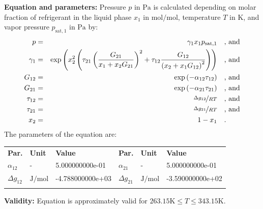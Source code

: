 \textbf{Equation and parameters:}
\newline
%
Pressure $p$ in $\si{\pascal}$ is calculated depending on molar fraction of refrigerant in the liquid phase $x_1$ in $\si{\mole\per\mole}$, temperature $T$ in $\si{\kelvin}$, and vapor pressure $p_\mathrm{sat,1}$ in $\si{\pascal}$ by:
%
\begin{equation*}
\begin{split}
p &=& \gamma_1 x_1 p_\mathrm{sat,1} & \quad\text{, and} \\
\gamma_1 &=& \exp \left( x_2^2 \left( \tau_{21} \left( \frac{G_{21}}{x_1 + x_2 G_{21}} \right) ^2 + \tau_{12} \frac{G_{12}}{\left( x_2 + x_1 G_{12} \right) ^2}\right) \right) & \quad\text{, and} \\
G_{12} &=& \exp \left( -\alpha_{12} \tau_{12} \right) & \quad\text{, and} \\
G_{21} &=& \exp \left( -\alpha_{21} \tau_{21} \right) & \quad\text{, and} \\
\tau_{12} &=& \nicefrac{\Delta g_{12}}{R T} & \quad\text{, and} \\
\tau_{21} &=& \nicefrac{\Delta g_{21}}{R T} & \quad\text{, and} \\
x_2 &=& 1 - x_1  & \quad\text{.} \\
\end{split}
\end{equation*}
%
The parameters of the equation are:
%
\begin{longtable}[l]{lll|lll}
\toprule
\addlinespace
\textbf{Par.} & \textbf{Unit} & \textbf{Value} &	\textbf{Par.} & \textbf{Unit} & \textbf{Value} \\
\addlinespace
\midrule
\endhead

\bottomrule
\endfoot
\bottomrule
\endlastfoot
\addlinespace

$\alpha_{12}$ & - & 5.000000000e-01 & $\alpha_{21}$ & - & 5.000000000e-01 \\
$\Delta g_{12}$ & $\si{\joule\per\mole}$ & -4.788000000e+03 & $\Delta g_{21}$ & $\si{\joule\per\mole}$ & -3.590000000e+02 \\

\addlinespace\end{longtable}

\textbf{Validity:}
\newline
Equation is approximately valid for $263.15 \si{\kelvin} \leq T \leq 343.15 \si{\kelvin}$.
\newline

